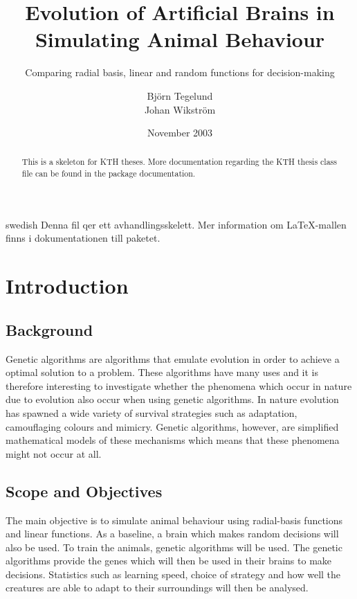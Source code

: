 \documentclass[a4paper,11pt]{kth-mag}
\title{Evolution of Artificial Brains in Simulating Animal Behaviour}
\subtitle{Comparing radial basis, linear and random functions for decision-making}
\author{Björn Tegelund\\Johan Wikström}
\date{November 2003}
\begin{document}
\frontmatter
\pagestyle{empty}
\removepagenumbers
\maketitle
{}
\begin{abstract}
  This is a skeleton for KTH theses. More documentation
  regarding the KTH thesis class file can be found in
  the package documentation.

\end{abstract}
\clearpage
\begin{foreignabstract}{swedish}
  Denna fil qer ett avhandlingsskelett.
  Mer information om \LaTeX-mallen finns i
  dokumentationen till paketet.

\end{foreignabstract}
\clearpage
\tableofcontents*
\mainmatter
\pagestyle{newchap}
\chapter{Introduction}

\section{Background}

Genetic algorithms are algorithms that emulate evolution in order to achieve a optimal solution to a problem. 
These algorithms have many uses and it is therefore interesting to investigate whether the phenomena which occur in nature due to evolution also occur when using genetic algorithms. In nature evolution has spawned a wide variety
of survival strategies such as adaptation, camouflaging colours and mimicry. Genetic algorithms, however, are 
 simplified mathematical models of these mechanisms which means that these phenomena might not occur 
at all.

\section{Scope and Objectives}

The main objective is to simulate animal behaviour using radial-basis functions and linear functions. As a baseline, a brain which makes random decisions will also be used. To train the animals, genetic algorithms will be used. The genetic algorithms provide the genes which will then be used in their brains to make decisions. Statistics such as learning speed, choice of strategy and how well the creatures are able to adapt to their surroundings will then be analysed. 
\end{document}
